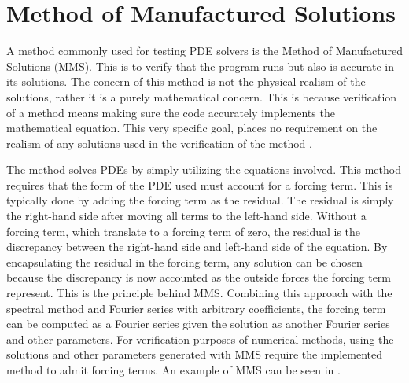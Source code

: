 \section{Method of Manufactured Solutions}
\noindent A method commonly used for testing PDE solvers is the Method of Manufactured Solutions (MMS). This is to verify that the program runs but also is accurate in its solutions. The concern of this method is not the physical realism of the solutions, rather it is a purely mathematical concern. This is because verification of a method means making sure the code accurately implements the mathematical equation. This very specific goal, places no requirement on the realism of any solutions used in the verification of the method \autocite{roacheCodeVerificationMethod2002,salariCodeVerificationMethod2000,vedovotoApplicationMethodManufactured2011}.

The method solves PDEs by simply utilizing the equations involved. This method requires that the form of the PDE used must account for a forcing term. This is typically done by adding the forcing term as the residual. The residual is simply the right-hand side after moving all terms to the left-hand side. Without a forcing term, which translate to a forcing term of zero, the residual is the discrepancy between the right-hand side and left-hand side of the equation. By encapsulating the residual in the forcing term, any solution can be chosen because the discrepancy is now accounted as the outside forces the forcing term represent. This is the principle behind MMS\@. Combining this approach with the spectral method and Fourier series with arbitrary coefficients, the forcing term can be computed as a Fourier series given the solution as another Fourier series and other parameters. For verification purposes of numerical methods, using the solutions and other parameters generated with MMS require the implemented method to admit forcing terms. An example of MMS can be seen in .



